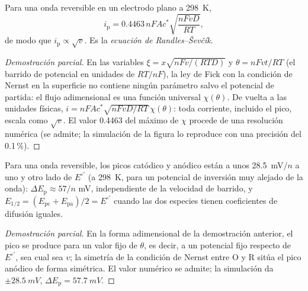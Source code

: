 \begin{proposition}\label{prop:b3:electrode-kinetics:randles-sevcik}
Para una onda reversible en un electrodo plano a \qty{298}{K},
\[
  i_{\mathrm p} = 0.4463\,nFAc^*\sqrt{\frac{nFvD}{RT}},
\]
de modo que $i_{\mathrm p} \propto \sqrt v$. Es la \emph{ecuación de Randles--Ševčík}.
\end{proposition}

\begin{proof}[Demostración parcial]
En las variables $\xi = x\sqrt{nFv/(RTD)}$ y $\theta = nFvt/RT$ (el barrido de potencial en unidades de
$RT/nF$), la ley de Fick con la condición de Nernst en la superficie no contiene ningún
parámetro salvo el potencial de partida: el flujo adimensional es una
función universal $\chi(\theta)$. De vuelta a las unidades físicas, $i = nFAc^*\sqrt{nFvD/RT}\,\chi(\theta)$: toda
corriente, incluido el pico, escala como $\sqrt v$. El valor 0.4463 del máximo de
$\chi$ procede de una resolución numérica (se admite; la simulación de la figura
lo reproduce con una precisión del 0.1\,\%).
\end{proof}

\begin{proposition}\label{prop:b3:electrode-kinetics:delta-ep}
Para una onda reversible, los picos catódico y anódico están a unos \qty{28.5}{mV}$/n$
a uno y otro lado de $E^{\circ\prime}$ (a \qty{298}{K}, para un potencial de inversión muy alejado de la onda):
$\Delta E_{\mathrm p} \approx 57/n$ mV, independiente de la velocidad de barrido, y $E_{1/2} = (E_{\mathrm{pc}} + E_{\mathrm{pa}})/2 =
E^{\circ\prime}$ cuando las dos especies tienen coeficientes de difusión iguales.
\end{proposition}

\begin{proof}[Demostración parcial]
En la forma adimensional de la demostración anterior, el pico se produce para un valor
fijo de $\theta$, es decir, a un potencial fijo respecto de $E^{\circ\prime}$, sea cual sea $v$; la
simetría de la condición de Nernst entre O y R sitúa el pico anódico de forma
simétrica. El valor numérico se admite; la simulación da
$\pm\qty{28.5}{mV}$, $\Delta E_{\mathrm p} = \qty{57.7}{mV}$.
\end{proof}

